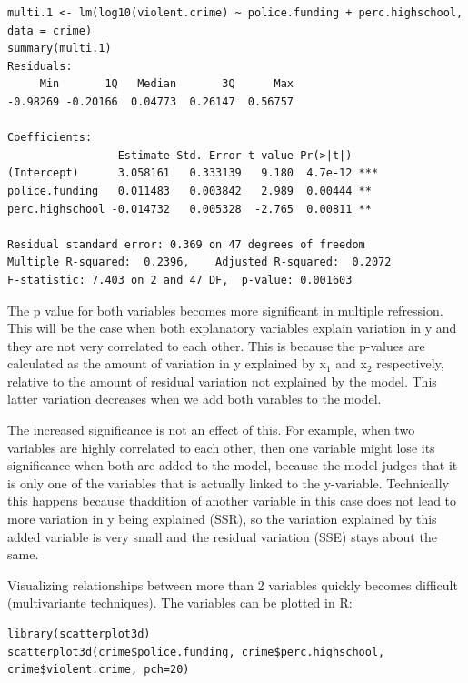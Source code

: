 \documentclass{article}
\begin{document}
\begin{lstlisting}
multi.1 <- lm(log10(violent.crime) ~ police.funding + perc.highschool, data = crime)
summary(multi.1)
Residuals:
     Min       1Q   Median       3Q      Max 
-0.98269 -0.20166  0.04773  0.26147  0.56757 

Coefficients:
                 Estimate Std. Error t value Pr(>|t|)    
(Intercept)      3.058161   0.333139   9.180  4.7e-12 ***
police.funding   0.011483   0.003842   2.989  0.00444 ** 
perc.highschool -0.014732   0.005328  -2.765  0.00811 ** 

Residual standard error: 0.369 on 47 degrees of freedom
Multiple R-squared:  0.2396,	Adjusted R-squared:  0.2072 
F-statistic: 7.403 on 2 and 47 DF,  p-value: 0.001603
\end{lstlisting}

The p value for both variables becomes more significant in multiple refression. This will be the case when both explanatory variables explain variation in y and they are not very correlated to each other. This is because the p-values are calculated as the amount of variation in y explained by x$_1$ and x$_2$ respectively, relative to the amount of residual variation not explained by the model. This latter variation decreases when we add both varables to the model. \par 
The increased significance is not an effect of this. For example, when two variables are highly correlated to each other, then one variable might lose its significance when both are added to the model, because the model judges that it is only one of the variables that is actually linked to the y-variable. Technically this happens because thaddition of another variable in this case does not lead to more variation in y being explained (SSR), so the variation explained by this added variable is very small and the residual variation (SSE) stays about the same.\par 
Visualizing relationships between more than 2 variables quickly becomes difficult (multivariante techniques). The variables can be plotted in R:

\begin{lstlisting}
library(scatterplot3d)
scatterplot3d(crime$police.funding, crime$perc.highschool, crime$violent.crime, pch=20)
\end{lstlisting}
\end{document}
